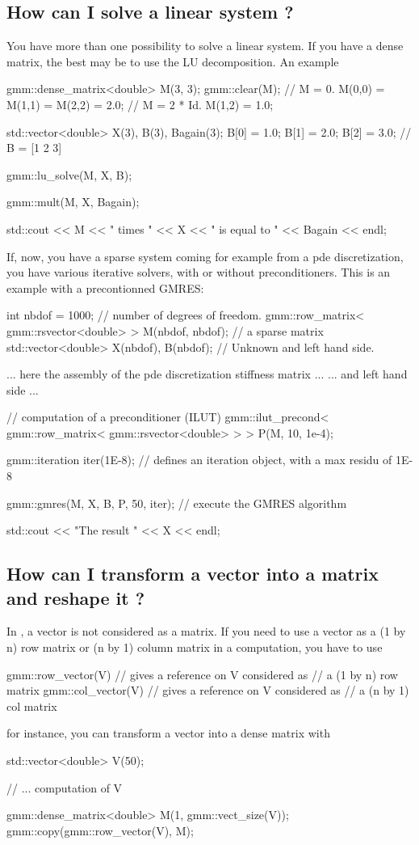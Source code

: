 \documentclass[11pt,a4paper]{article}
\begin{document}
\subsection{How can I solve a linear system ?}
You have more than one possibility to solve a linear system. If you have a dense matrix, the best may be to use the LU decomposition. An example
\begin{cppcode}
  gmm::dense_matrix<double> M(3, 3);
  gmm::clear(M);                  // M = 0.
  M(0,0) = M(1,1) = M(2,2) = 2.0; // M = 2 * Id.
  M(1,2) = 1.0;

  std::vector<double> X(3), B(3), Bagain(3);
  B[0] = 1.0; B[1] = 2.0; B[2] = 3.0;  // B = [1 2 3]
 
  gmm::lu_solve(M, X, B);

  gmm::mult(M, X, Bagain);

  std::cout << M << " times " << X << " is equal to " << Bagain << endl;
\end{cppcode}

If, now, you have a sparse system coming for example from a pde discretization, you have various iterative solvers, with or without preconditioners. This is an example with a precontionned GMRES:
 \begin{cppcode}
  int nbdof = 1000; // number of degrees of freedom.
  gmm::row_matrix< gmm::rsvector<double> > M(nbdof, nbdof); // a sparse matrix
  std::vector<double> X(nbdof), B(nbdof); // Unknown and left hand side.

  ... here the assembly of the pde discretization stiffness matrix ...
  ... and left hand side ...


  // computation of a preconditioner (ILUT)
  gmm::ilut_precond< gmm::row_matrix< gmm::rsvector<double> > > P(M, 10, 1e-4);

  gmm::iteration iter(1E-8);  // defines an iteration object, with a max residu of 1E-8

  gmm::gmres(M, X, B, P, 50, iter);  // execute the GMRES algorithm

  std::cout << "The result " << X << endl;
\end{cppcode}

\subsection{How can I transform a vector into a matrix and reshape it ?}
In \gmm, a vector is not considered as a matrix. If you need to use a vector as a (1 by n) row matrix or (n by 1) column matrix in a computation, you have to use
\begin{cppcode}
   gmm::row_vector(V) // gives a reference on V considered as
                      // a (1 by n) row matrix
   gmm::col_vector(V) // gives a reference on V considered as
                      // a (n by 1) col matrix
\end{cppcode}
for instance, you can transform a vector into a dense matrix with
\begin{cppcode}
  std::vector<double> V(50);

  // ... computation of V

  gmm::dense_matrix<double> M(1, gmm::vect_size(V));
  gmm::copy(gmm::row_vector(V), M);
\end{cppcode}
\end{document}
